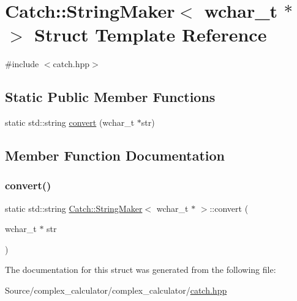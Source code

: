 \hypertarget{struct_catch_1_1_string_maker_3_01wchar__t_01_5_01_4}{}\section{Catch\+:\+:String\+Maker$<$ wchar\+\_\+t $\ast$ $>$ Struct Template Reference}
\label{struct_catch_1_1_string_maker_3_01wchar__t_01_5_01_4}


{\ttfamily \#include $<$catch.\+hpp$>$}

\subsection*{Static Public Member Functions}
\begin{DoxyCompactItemize}
\item 
static std\+::string \mbox{\hyperlink{struct_catch_1_1_string_maker_3_01wchar__t_01_5_01_4_a6112fe324da2a0b3a690071a228ecd71}{convert}} (wchar\+\_\+t $\ast$str)
\end{DoxyCompactItemize}


\subsection{Member Function Documentation}
\mbox{\label{struct_catch_1_1_string_maker_3_01wchar__t_01_5_01_4_a6112fe324da2a0b3a690071a228ecd71}} 
\subsubsection{\texorpdfstring{convert()}{convert()}}
{\footnotesize\ttfamily static std\+::string \mbox{\hyperlink{struct_catch_1_1_string_maker}{Catch\+::\+String\+Maker}}$<$ wchar\+\_\+t $\ast$ $>$\+::convert (\begin{DoxyParamCaption}\item[{wchar\+\_\+t $\ast$}]{str }\end{DoxyParamCaption})\hspace{0.3cm}{\ttfamily [static]}}



The documentation for this struct was generated from the following file\+:\begin{DoxyCompactItemize}
\item 
Source/complex\+\_\+calculator/complex\+\_\+calculator/\mbox{\hyperlink{catch_8hpp}{catch.\+hpp}}\end{DoxyCompactItemize}
